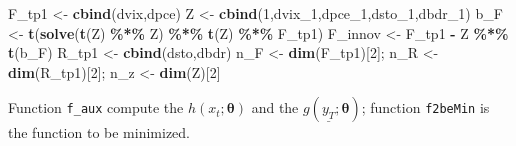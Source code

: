 \documentclass[
  12pt,
]{book}
\newenvironment{Shaded}{\begin{snugshade}}{\end{snugshade}}
\newcommand{\DecValTok}[1]{\textcolor[rgb]{0.00,0.00,0.81}{#1}}
\newcommand{\FunctionTok}[1]{\textcolor[rgb]{0.13,0.29,0.53}{\textbf{#1}}}
\newcommand{\NormalTok}[1]{#1}
\newcommand{\OtherTok}[1]{\textcolor[rgb]{0.56,0.35,0.01}{#1}}
\newcommand{\SpecialCharTok}[1]{\textcolor[rgb]{0.81,0.36,0.00}{\textbf{#1}}}
\theoremstyle{definition}
\theoremstyle{definition}
\theoremstyle{definition}
\theoremstyle{definition}
\theoremstyle{remark}
\begin{document}
\begin{Shaded}
\begin{Highlighting}[]
\NormalTok{F\_tp1 }\OtherTok{\textless{}{-}} \FunctionTok{cbind}\NormalTok{(dvix,dpce)}
\NormalTok{Z     }\OtherTok{\textless{}{-}} \FunctionTok{cbind}\NormalTok{(}\DecValTok{1}\NormalTok{,dvix\_1,dpce\_1,dsto\_1,dbdr\_1)}
\NormalTok{b\_F }\OtherTok{\textless{}{-}} \FunctionTok{t}\NormalTok{(}\FunctionTok{solve}\NormalTok{(}\FunctionTok{t}\NormalTok{(Z) }\SpecialCharTok{\%*\%}\NormalTok{ Z) }\SpecialCharTok{\%*\%} \FunctionTok{t}\NormalTok{(Z) }\SpecialCharTok{\%*\%}\NormalTok{ F\_tp1)}
\NormalTok{F\_innov }\OtherTok{\textless{}{-}}\NormalTok{ F\_tp1 }\SpecialCharTok{{-}}\NormalTok{ Z }\SpecialCharTok{\%*\%} \FunctionTok{t}\NormalTok{(b\_F)}
\NormalTok{R\_tp1 }\OtherTok{\textless{}{-}} \FunctionTok{cbind}\NormalTok{(dsto,dbdr)}
\NormalTok{n\_F }\OtherTok{\textless{}{-}} \FunctionTok{dim}\NormalTok{(F\_tp1)[}\DecValTok{2}\NormalTok{]; n\_R }\OtherTok{\textless{}{-}} \FunctionTok{dim}\NormalTok{(R\_tp1)[}\DecValTok{2}\NormalTok{]; n\_z }\OtherTok{\textless{}{-}} \FunctionTok{dim}\NormalTok{(Z)[}\DecValTok{2}\NormalTok{]}
\end{Highlighting}
\end{Shaded}

Function \texttt{f\_aux} compute the \(h(x_t;{\boldsymbol\theta})\) and the \(g(\underline{y_T};{\boldsymbol\theta})\); function \texttt{f2beMin} is the function to be minimized.
\end{document}
